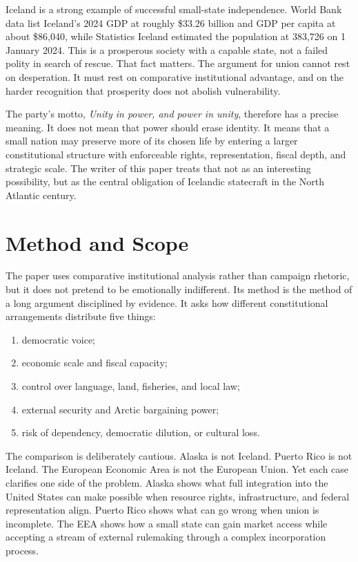 \documentclass[11pt,a4paper]{article}
\newcommand{\MottoEN}{Unity in power, and power in unity}
\begin{document}
Iceland is a strong example of successful small-state independence. World Bank data list Iceland's 2024 GDP at roughly \$33.26 billion and GDP per capita at about \$86,040, while Statistics Iceland estimated the population at 383,726 on 1 January 2024.\cite{worldbankiceland,statisticsiceland} This is a prosperous society with a capable state, not a failed polity in search of rescue. That fact matters. The argument for union cannot rest on desperation. It must rest on comparative institutional advantage, and on the harder recognition that prosperity does not abolish vulnerability.

The party's motto, \textit{\MottoEN}, therefore has a precise meaning. It does not mean that power should erase identity. It means that a small nation may preserve more of its chosen life by entering a larger constitutional structure with enforceable rights, representation, fiscal depth, and strategic scale. The writer of this paper treats that not as an interesting possibility, but as the central obligation of Icelandic statecraft in the North Atlantic century.

\section{Method and Scope}
The paper uses comparative institutional analysis rather than campaign rhetoric, but it does not pretend to be emotionally indifferent. Its method is the method of a long argument disciplined by evidence. It asks how different constitutional arrangements distribute five things:

\begin{enumerate}
  \item democratic voice;
  \item economic scale and fiscal capacity;
  \item control over language, land, fisheries, and local law;
  \item external security and Arctic bargaining power;
  \item risk of dependency, democratic dilution, or cultural loss.
\end{enumerate}

The comparison is deliberately cautious. Alaska is not Iceland. Puerto Rico is not Iceland. The European Economic Area is not the European Union. Yet each case clarifies one side of the problem. Alaska shows what full integration into the United States can make possible when resource rights, infrastructure, and federal representation align. Puerto Rico shows what can go wrong when union is incomplete. The EEA shows how a small state can gain market access while accepting a stream of external rulemaking through a complex incorporation process.\cite{eftaeea}
\end{document}
